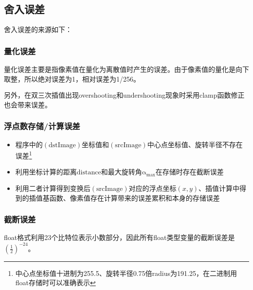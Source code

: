 \documentclass{article}
\begin{document}
\subsection{舍入误差}
舍入误差的来源如下：

\subsubsection{量化误差}
量化误差主要是指像素值在量化为离散值时产生的误差。由于像素值的量化是向下取整，所以绝对误差为1，相对误差为1/256。

另外，在双三次插值出现overshooting和undershooting现象时采用clamp函数修正也会带来误差。

\subsubsection{浮点数存储/计算误差}
\begin{itemize}
	\item 程序中的$\mathrm{(dstImage)}$坐标值和$\mathrm{(srcImage)}$中心点坐标值、旋转半径不存在误差\footnote{中心点坐标值十进制为255.5、旋转半径0.75倍radius为191.25，在二进制用float存储时可以准确表示}
	\item 利用坐标计算的距离$\mathrm{distance}$和最大旋转角$\mathrm{\alpha_{max}}$在存储时存在截断误差
	\item 利用二者计算得到变换后$\mathrm{(srcImage)}$对应的浮点坐标$(x,y)$、插值计算中得到的插值基函数、像素值存在计算带来的误差累积和本身的存储误差
\end{itemize}

\subsubsection{截断误差}
float格式利用23个比特位表示小数部分，因此所有float类型变量的截断误差是$(\frac{1}{2})^{-24}$。
\end{document}
